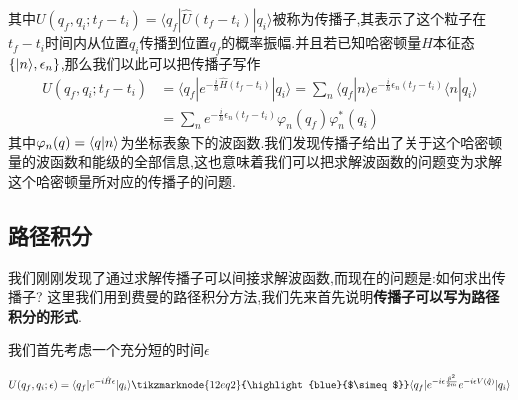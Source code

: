 其中$U(q_f,q_i;t_f-t_i) = \langle q_f|\hat{U}(t_f-t_i)|q_i\rangle $被称为传播子,其表示了这个粒子在$t_f-t_i$时间内从位置$q_i$传播到位置$q_f$的概率振幅.并且若已知哈密顿量$\hat{H}$本征态$\{|n\rangle,\epsilon_n\}$,那么我们以此可以把传播子写作
\begin{equation}
	\begin{aligned}U(q_f,q_i;t_f-t_i)&=\langle q_f|e^{-\frac{i}{\hbar}\hat{H}(t_f-t_i)}|q_i\rangle=\sum_n\langle q_f|n\rangle e^{-\frac{i}{\hbar}\epsilon_n(t_f-t_i)}\langle n|q_i\rangle\\[2ex]&=\sum_ne^{-\frac{i}{\hbar}\epsilon_n(t_f-t_i)}\varphi_n(q_f)\varphi_n^*(q_i)\end{aligned}
\end{equation}
其中$\varphi_n(q)=\langle q|n\rangle$为坐标表象下的波函数.我们发现传播子给出了关于这个哈密顿量的波函数和能级的全部信息,这也意味着我们可以把求解波函数的问题变为求解这个哈密顿量所对应的传播子的问题.
\subsection*{路径积分}
我们刚刚发现了通过求解传播子可以间接求解波函数,而现在的问题是:如何求出传播子? 这里我们用到费曼的路径积分方法,我们先来首先说明\textbf{传播子可以写为路径积分的形式}.

我们首先考虑一个充分短的时间$\epsilon$

\begin{equation}
	\vspace{\baselineskip}
	U(q_f,q_i;\epsilon)=\langle q_f|e^{-i\hat{H}\epsilon}|q_i\rangle \tikzmarknode{12eq2}{\highlight{blue}{$\simeq$}}\langle q_f|e^{-i\epsilon\frac{\hat{p}^2}{2m}}e^{-i\epsilon V(\hat{q})}|q_i\rangle
\end{equation}


